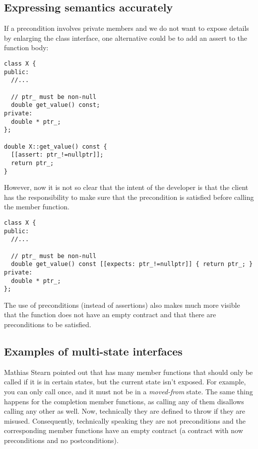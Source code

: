 \subsection{Expressing semantics accurately}

If a precondition involves private members and we do not want to expose details
by enlarging the class interface, one alternative could be to add an assert to
the function body:

\begin{lstlisting}
class X {
public:
  //...

  // ptr_ must be non-null
  double get_value() const;
private:
  double * ptr_;
};

double X::get_value() const {
  [[assert: ptr_!=nullptr]];
  return ptr_;
}
\end{lstlisting}

However, now it is not so clear that the intent of the developer is that the
client has the responsibility to make sure that the precondition is satisfied
before calling the member function.

\begin{lstlisting}
class X {
public:
  //...

  // ptr_ must be non-null
  double get_value() const [[expects: ptr_!=nullptr]] { return ptr_; }
private:
  double * ptr_;
};
\end{lstlisting}

The use of preconditions (instead of assertions) also makes much more visible
that the function does not have an empty contract and that there are
preconditions to be satisfied.

\subsection{Examples of multi-state interfaces}

Mathias Stearn pointed out that
 has many member functions that should only be called if it
is in certain states, but the current state isn't exposed. For example, you can
only call  once, and it must not be in a \emph{moved-from}
state. The same thing happens for the completion member functions, as calling any of
them disallows calling any other as well. Now, technically they are defined to
throw if they are misused. Consequently, technically speaking they are not
preconditions and the corresponding member functions have an empty contract (a
contract with now preconditions and no postconditions). 

